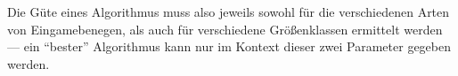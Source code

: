 Die Güte eines Algorithmus muss also jeweils sowohl für die verschiedenen Arten von Eingamebenegen, als auch für verschiedene Größenklassen ermittelt werden --- ein \enquote{bester} Algorithmus kann nur im Kontext dieser zwei Parameter gegeben werden.






